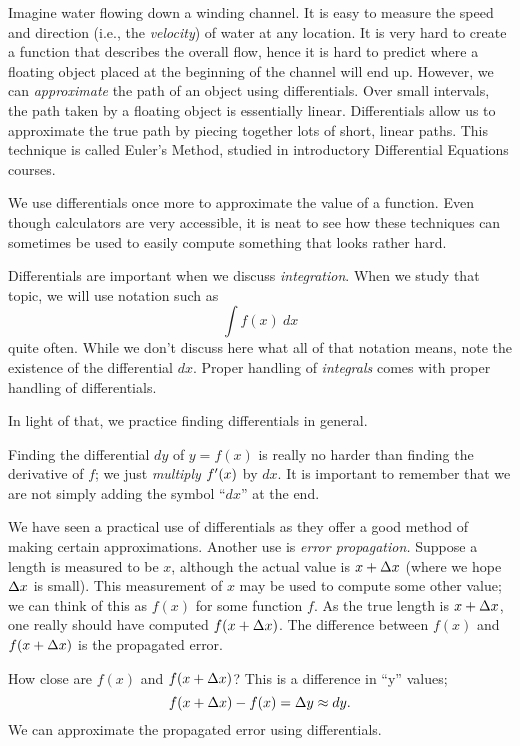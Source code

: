 Imagine water flowing down a winding channel. It is easy to measure the speed and direction (i.e., the \textit{velocity}) of water at any location. It is very hard to create a function that describes the overall flow, hence it is hard to predict where a floating object placed at the beginning of the channel will end up. However, we can \textit{approximate} the path of an object using differentials. Over small intervals, the path taken by a floating object is essentially linear. Differentials allow us to approximate the true path by piecing together lots of short, linear paths. This technique is called Euler's Method, studied in introductory Differential Equations courses.

We use differentials once more to approximate the value of a function. Even though calculators are very accessible, it is neat to see how these techniques can sometimes be used to easily compute something that looks rather hard.


Differentials are important when we discuss \textit{integration}. When we study that topic, we will use notation such as $$\int f(x)\ dx$$ quite often. While we don't discuss here what all of that notation means, note the existence of the differential $dx$. Proper handling of \textit{integrals} comes with proper handling of differentials. 

In light of that, we practice finding differentials in general.


Finding the differential $dy$ of $y=f(x)$ is really no harder than finding the derivative of $f$; we just \textit{multiply} $f'(x)$ by $dx$. It is important to remember that we are not simply adding the symbol ``$dx$'' at the end.

We have seen a practical use of differentials as they offer a good method of making certain approximations. Another use is \textit{error propagation.} Suppose a length is measured to be $x$, although the actual value is $x+\Delta x$ (where we hope $\Delta x$ is small). This measurement of $x$ may be used to compute some other value; we can think of this as $f(x)$ for some function $f$. As the true length is $x+\Delta x$, one really should have computed $f(x+\Delta x)$. The difference between $f(x)$ and $f(x+\Delta x)$ is the propagated error. 

How close are $f(x)$ and $f(x+\Delta x)$? This is a difference in ``y'' values; $$f(x+\Delta x)-f(x) = \Delta y \approx dy.$$ We can approximate the propagated error using differentials.

